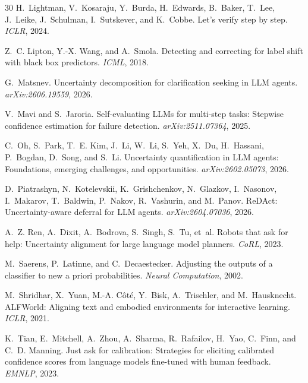 \documentclass{article}
\begin{document}
\begin{thebibliography}{30}
H.~Lightman, V.~Kosaraju, Y.~Burda, H.~Edwards, B.~Baker, T.~Lee,
J.~Leike, J.~Schulman, I.~Sutskever, and K.~Cobbe.
\newblock Let's verify step by step.
\newblock \emph{ICLR}, 2024.

Z.~C. Lipton, Y.-X. Wang, and A.~Smola.
\newblock Detecting and correcting for label shift with black box predictors.
\newblock \emph{ICML}, 2018.

G.~Matsnev.
\newblock Uncertainty decomposition for clarification seeking in LLM agents.
\newblock \emph{arXiv:2606.19559}, 2026.

V.~Mavi and S.~Jaroria.
\newblock Self-evaluating LLMs for multi-step tasks: Stepwise confidence
estimation for failure detection.
\newblock \emph{arXiv:2511.07364}, 2025.

C.~Oh, S.~Park, T.~E. Kim, J.~Li, W.~Li, S.~Yeh, X.~Du, H.~Hassani,
P.~Bogdan, D.~Song, and S.~Li.
\newblock Uncertainty quantification in LLM agents: Foundations, emerging
challenges, and opportunities.
\newblock \emph{arXiv:2602.05073}, 2026.

D.~Piatrashyn, N.~Kotelevskii, K.~Grishchenkov, N.~Glazkov, I.~Nasonov,
I.~Makarov, T.~Baldwin, P.~Nakov, R.~Vashurin, and M.~Panov.
\newblock ReDAct: Uncertainty-aware deferral for LLM agents.
\newblock \emph{arXiv:2604.07036}, 2026.

A.~Z. Ren, A.~Dixit, A.~Bodrova, S.~Singh, S.~Tu, et~al.
\newblock Robots that ask for help: Uncertainty alignment for large language
model planners.
\newblock \emph{CoRL}, 2023.

M.~Saerens, P.~Latinne, and C.~Decaestecker.
\newblock Adjusting the outputs of a classifier to new a priori probabilities.
\newblock \emph{Neural Computation}, 2002.

M.~Shridhar, X.~Yuan, M.-A. C\^{o}t\'{e}, Y.~Bisk, A.~Trischler, and
M.~Hausknecht.
\newblock ALFWorld: Aligning text and embodied environments for interactive
learning.
\newblock \emph{ICLR}, 2021.

K.~Tian, E.~Mitchell, A.~Zhou, A.~Sharma, R.~Rafailov, H.~Yao, C.~Finn, and
C.~D. Manning.
\newblock Just ask for calibration: Strategies for eliciting calibrated
confidence scores from language models fine-tuned with human feedback.
\newblock \emph{EMNLP}, 2023.


\end{thebibliography}
\end{document}
